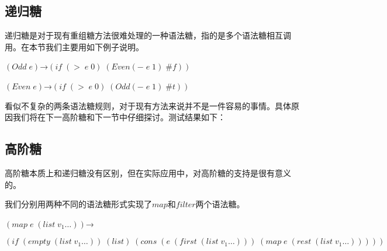 \subsection{递归糖}

递归糖是对于现有重组糖方法很难处理的一种语法糖，指的是多个语法糖相互调用。在本节我们主要用如下例子说明。

$(Odd\;e)$→$(if\;(>\;e\;0)\;(Even (-\;e\;1)\;\#f))$

$(Even\;e)$→$(if\;(>\;e\;0)\;(Odd (-\;e\;1)\;\#t))$

看似不复杂的两条语法糖规则，对于现有方法来说并不是一件容易的事情。具体原因我们将在下一高阶糖和下一节中仔细探讨。测试结果如下：

\begin{center}
\end{center}

\subsection{高阶糖}

高阶糖本质上和递归糖没有区别，但在实际应用中，对高阶糖的支持是很有意义的。

我们分别用两种不同的语法糖形式实现了$map$和$filter$两个语法糖。
\begin{flushleft}
	$(map\;e\;(list\;v_1\ldots))$→
	
	$(if\;(empty\;(list\;v_1\ldots))\;(list)\;(cons\;(e\;(first\;(list\;v_1\ldots)))\;(map\;e\;(rest\;(list\;v_1\ldots)))))$
\end{flushleft}

